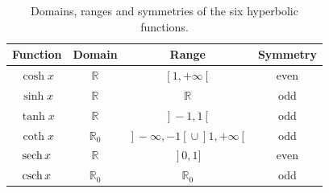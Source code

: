 \begin{table}[h]
\caption{Domains, ranges and symmetries of the six hyperbolic functions.}
\label{tab_trans_4}
\begin{tabular}{c|ccc}
Function & Domain & Range&Symmetry\\ \hline\hline
$\cosh x$ & $\mathbb{R}$ & $\left[\right.1,+\infty\left[\right.$&even\\
$\sinh x$ & $\mathbb{R}$ & $\mathbb{R}$&odd\\
$\tanh x$ & $\mathbb{R}$ & $\left.\right]-1,1\left[\right.$&odd\\
$\coth x$ & $\mathbb{R}_0$ & $\left.\right]-\infty,-1\left[\right.\cup \left.\right]1,+\infty\left[\right.$&odd\\
$\operatorname{sech} x$ & $\mathbb{R}$ & $\left.\right]0,1]$&even \\
$\operatorname{csch} x$ & $\mathbb{R}_0$ & $\mathbb{R}_0$&odd\\\hline\hline
\end{tabular}
\end{table}


